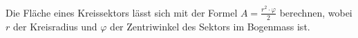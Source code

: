 
Die Fläche eines Kreissektors lässt sich mit der Formel $A=\frac{r^2\cdot\varphi}{2}$ berechnen, wobei $r$ der Kreisradius und $\varphi$ der Zentriwinkel des Sektors im Bogenmass ist.
